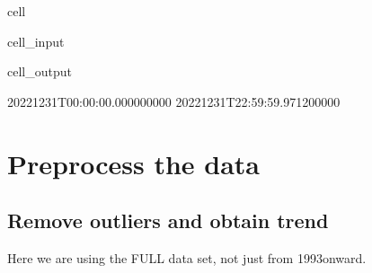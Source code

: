 \documentclass[letterpaper,10pt,english]{jupyterBook}
\begin{document}
\begin{sphinxuseclass}{cell}
\begin{sphinxVerbatimInput}
\begin{sphinxuseclass}{cell_input}
\begin{sphinxVerbatim}[commandchars=\\\{\}]
     
     

\PYG{p}{[}\PYG{p}{]}
\PYG{p}{[}\PYG{p}{]}
\end{sphinxVerbatim}

\end{sphinxuseclass}\end{sphinxVerbatimInput}
\begin{sphinxVerbatimOutput}

\begin{sphinxuseclass}{cell_output}
\begin{sphinxVerbatim}[commandchars=\\\{\}]
2022\PYGZhy{}12\PYGZhy{}31T00:00:00.000000000
2022\PYGZhy{}12\PYGZhy{}31T22:59:59.971200000
\end{sphinxVerbatim}

\end{sphinxuseclass}\end{sphinxVerbatimOutput}

\end{sphinxuseclass}

\chapter{Pre\sphinxhyphen{}process the data}
\label{\detokenize{notebooks/regional_and_local/SL_Extremes_annual:pre-process-the-data}}

\section{Remove outliers and obtain trend}
\label{\detokenize{notebooks/regional_and_local/SL_Extremes_annual:remove-outliers-and-obtain-trend}}
\sphinxAtStartPar
Here we are using the FULL data set, not just from 1993\sphinxhyphen{}onward.
\end{document}
